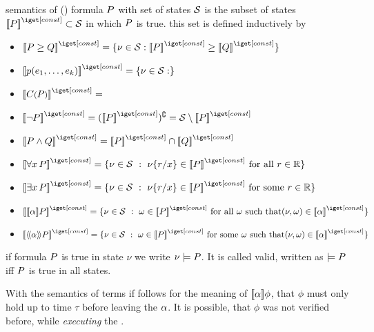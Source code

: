     \begin{definition}
        \label{def:semantic-formulae}

        semantics of (\dL) formula $P$ with set of states $\mathcal{S}$ is the subset of states $\imodel{}{\asfml}\subset\states$ in which $P$ is true. this set is defined inductively by

        \begin{itemize}
            \item $\imodel{}{\asfml\geq\bsfml} = \{\nu\in\states : \imodel{}{\asfml}\geq\imodel{}{\bsfml}\}$
            \item $\imodel{}{p(\istrm{1},\ldots,\istrm{k})} = \{\nu\in\states : \}$
            \item $\imodel{}{\contextapp{C}{\asfml}} = $
            \item $\imodel{}{\lnot\asfml} = \scomplement{(\imodel{}{\asfml})} = \states\setminus\imodel{}{\asfml}$
            \item $\imodel{}{\asfml\land\bsfml} = \imodel{}{\asfml}\cap\imodel{}{\bsfml}$
            \item $\imodel{}{\lforall{x}{\asfml}} = \{\nu\in\states \with \modif{\nu}{x}{r}\in\imodel{}{\asfml} \text{ for all } r\in\R \}$
            \item $\imodel{}{\lexists{x}{\asfml}} = \{\nu\in\states \with \modif{\nu}{x}{r}\in\imodel{}{\asfml} \text{ for some } r\in\R \}$
            \item $\imodel{}{\dbox{\asprg}{\asfml}} = \{\nu\in\states \with \omega\in\imodel{}{\asfml} \text{ for all $\omega$ such that} (\nu,\omega)\in\imodel{}{\asprg}\}$
            \item $\imodel{}{\ddiamond{\asprg}{\asfml}} = \{\nu\in\states \with \omega\in\imodel{}{\asfml} \text{ for some $\omega$ such that} (\nu,\omega)\in\imodel{}{\asprg}\}$
        \end{itemize}
        if formula $P$ is true in state $\nu$ we write $\nu\models P$. It is called valid, written as $\models P$ iff $P$ is true in all states.

    \end{definition}


        With the semantics of terms if follows for the meaning of $\dbox{\asprg}{\phi}$, that $\phi$ must only hold up to time $\tau$ before leaving the \HP $\alpha$. It is possible, that $\phi$ was not verified before, while \textit{executing} the \HP.

